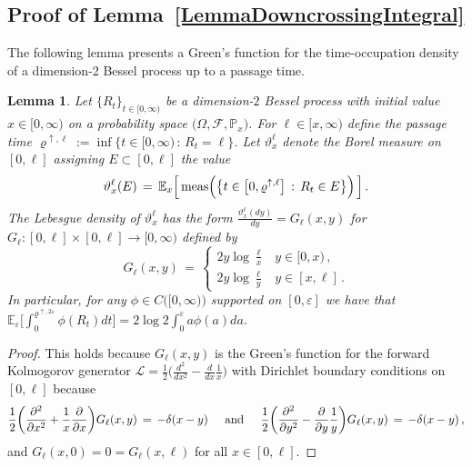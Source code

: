 \documentclass[10pt]{article}
\numberwithin{equation}{section}
\newtheorem{lemma}[theorem]{Lemma}
\theoremstyle{definition}
\begin{document}
\subsection{Proof of Lemma~\ref{LemmaDowncrossingIntegral}}\label{SubsectionLemmaDowncrossingIntegral}



The following lemma presents a Green's function for  the time-occupation density of a dimension-2 Bessel process up to a passage time.
\begin{lemma}\label{LemmaBessel}  Let $\{R_t\}_{t\in [0,\infty)}$ be a dimension-$2$ Bessel process with initial value $x\in [0,\infty)$ on a probability space $\big(\Omega, \mathscr{F}, \mathbb{P}_x\big)$.  For $\ell\in [ x, \infty)$ define the passage time $\varrho^{\uparrow,\ell}:=\inf\{t\in [0,\infty)\,:\,R_t = \ell  \}$. Let $\vartheta_x^{\ell}$ denote the Borel measure  on $[0,\ell]$
assigning $E\subset [0,\ell]$ the value
$$  \vartheta_x^{\ell}(E)\,=\,\mathbb{E}_x\Big[\,\textup{meas}\Big(\big\{t\in \big[0,\varrho^{\uparrow,\ell}\big]\,:\,R_t\in E   \big\}\Big) \,\Big] \, . $$
The Lebesgue density of $\vartheta_x^{\ell} $ has the form $\frac{ \vartheta_x^{\ell}(dy) }{ dy }=G_{\ell}(x,y)$ for $G_{\ell}:[0,\ell]\times [0,\ell]\rightarrow [0,\infty)$ defined by
$$ G_{\ell}(x,y)\,=\,\begin{cases} 2y\log \frac{\ell}{x}  & y\in [0,x)  \, ,  \\ 2y\log \frac{\ell}{y}    &  y\in  [x,\ell] \, . \end{cases} 
    $$
In particular, for any $\phi\in C\big([0,\infty)\big)$ supported on $[0,\varepsilon]$ we have that 
$\mathbb{E}_{\varepsilon}\big[ \int_0^{ \varrho^{\uparrow,2\varepsilon} }\phi(R_t)dt \big]=2\log 2 \int_0^{\varepsilon}a\phi(a)da  $.   

\end{lemma}

\begin{proof} This holds because $G_{\ell}(x,y)$ is the Green's function for the forward Kolmogorov generator $\mathcal{L}=\frac{1}{2}\big(\frac{d^2}{dx^2}-\frac{d}{dx}\frac{1}{x}\big)$ with Dirichlet boundary conditions on $[0,\ell]$ because
$$ \frac{1}{2}\bigg( \frac{\partial^2}{\partial x^2}+\frac{1}{x}\frac{\partial }{\partial x}  \bigg) G_{\ell}(x,y)\,=\,-\delta(x-y)
   \hspace{.5cm} \text{and}\hspace{.5cm}   \frac{1}{2} \bigg( \frac{\partial^2}{\partial y^2}-\frac{\partial}{\partial y}\frac{1}{y}  \bigg) G_{\ell}(x,y)\,=\,-\delta(x-y)  \,, $$
and $G_{\ell}(x,0)=0=G_{\ell}(x,\ell)$ for all $x\in [0,\ell]$.
\end{proof}
\end{document}

